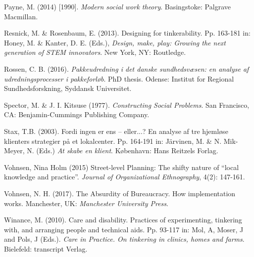 \begin{thebibliography}{99}
\item Payne, M. (2014) [1990]. \textit{Modern social work theory}. Basingstoke: Palgrave Macmillan.
\item Resnick, M. \& Rosenbaum, E. (2013). Designing for tinkerability. Pp. 163-181 in: Honey, M. \& Kanter, D. E. (Eds.), \textit{Design, make, play: Growing the next generation of STEM innovators}. New York, NY: Routledge. 
\item Rossen, C. B. (2016). \textit{Pakkeudredning i det danske sundhedsvæsen: en analyse af udredningsprocesser i pakkeforløb}. PhD thesis. Odense: Institut for Regional Sundhedsforskning, Syddansk Universitet.
\item Spector, M. \& J. I. Kitsuse (1977). \textit{Constructing Social Problems}. San Francisco, CA: Benjamin-Cummings Publishing Company.
\item Stax, T.B. (2003). Fordi ingen er ens – eller...? En analyse af tre hjemløse klienters strategier på et lokalcenter. Pp. 164-191 in: Järvinen, M. \& N. Mik-Meyer, N. (Eds.) \textit{At skabe en klient}. København: Hans Reitzels Forlag.
\item Vohnsen, Nina Holm (2015) Street-level Planning: The shifty nature of “local knowledge and practice”. \textit{Journal of Organizational Ethnography}, 4(2): 147-161.
\item Vohnsen, N. H. (2017). The Absurdity of Bureaucracy. How implementation works. Manchester, UK: \textit{Manchester University Press}.
\item Winance, M. (2010). Care and disability. Practices of experimenting, tinkering with, and arranging people and technical aids. Pp. 93-117 in: Mol, A, Moser, J and Pols, J (Eds.). \textit{Care in Practice. On tinkering in clinics, homes and farms}. Bielefeld: transcript Verlag.

\end{thebibliography}